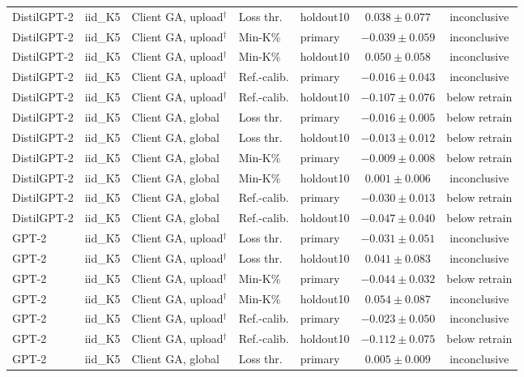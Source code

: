 {\begin{longtable}{@{\extracolsep{\fill}}lllllcc@{}}
DistilGPT-2 & iid\_K5 & Client GA, upload$^{\dagger}$ & Loss thr. & holdout10 & $0.038 \pm 0.077$ & inconclusive \\
DistilGPT-2 & iid\_K5 & Client GA, upload$^{\dagger}$ & Min-K\% & primary & $-0.039 \pm 0.059$ & inconclusive \\
DistilGPT-2 & iid\_K5 & Client GA, upload$^{\dagger}$ & Min-K\% & holdout10 & $0.050 \pm 0.058$ & inconclusive \\
DistilGPT-2 & iid\_K5 & Client GA, upload$^{\dagger}$ & Ref.-calib. & primary & $-0.016 \pm 0.043$ & inconclusive \\
DistilGPT-2 & iid\_K5 & Client GA, upload$^{\dagger}$ & Ref.-calib. & holdout10 & $-0.107 \pm 0.076$ & below retrain \\
DistilGPT-2 & iid\_K5 & Client GA, global & Loss thr. & primary & $-0.016 \pm 0.005$ & below retrain \\
DistilGPT-2 & iid\_K5 & Client GA, global & Loss thr. & holdout10 & $-0.013 \pm 0.012$ & below retrain \\
DistilGPT-2 & iid\_K5 & Client GA, global & Min-K\% & primary & $-0.009 \pm 0.008$ & below retrain \\
DistilGPT-2 & iid\_K5 & Client GA, global & Min-K\% & holdout10 & $0.001 \pm 0.006$ & inconclusive \\
DistilGPT-2 & iid\_K5 & Client GA, global & Ref.-calib. & primary & $-0.030 \pm 0.013$ & below retrain \\
DistilGPT-2 & iid\_K5 & Client GA, global & Ref.-calib. & holdout10 & $-0.047 \pm 0.040$ & below retrain \\
GPT-2 & iid\_K5 & Client GA, upload$^{\dagger}$ & Loss thr. & primary & $-0.031 \pm 0.051$ & inconclusive \\
GPT-2 & iid\_K5 & Client GA, upload$^{\dagger}$ & Loss thr. & holdout10 & $0.041 \pm 0.083$ & inconclusive \\
GPT-2 & iid\_K5 & Client GA, upload$^{\dagger}$ & Min-K\% & primary & $-0.044 \pm 0.032$ & below retrain \\
GPT-2 & iid\_K5 & Client GA, upload$^{\dagger}$ & Min-K\% & holdout10 & $0.054 \pm 0.087$ & inconclusive \\
GPT-2 & iid\_K5 & Client GA, upload$^{\dagger}$ & Ref.-calib. & primary & $-0.023 \pm 0.050$ & inconclusive \\
GPT-2 & iid\_K5 & Client GA, upload$^{\dagger}$ & Ref.-calib. & holdout10 & $-0.112 \pm 0.075$ & below retrain \\
GPT-2 & iid\_K5 & Client GA, global & Loss thr. & primary & $0.005 \pm 0.009$ & inconclusive \\

\end{longtable}}
